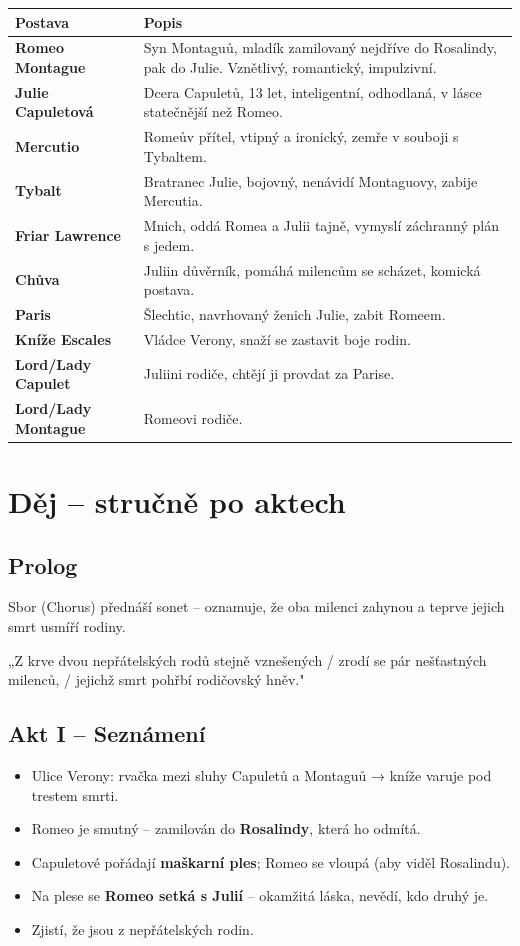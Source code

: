 \documentclass[12pt,a4paper]{article}
\begin{document}
\begin{tabular}{>{\bfseries}p{3.5cm} p{10cm}}
  \toprule
  Postava & Popis \\
  \midrule
  Romeo Montague & Syn Montaguů, mladík zamilovaný nejdříve do Rosalindy, pak do Julie. Vznětlivý, romantický, impulzivní. \\[0.3em]
  Julie Capuletová & Dcera Capuletů, 13 let, inteligentní, odhodlaná, v lásce statečnější než Romeo. \\[0.3em]
  Mercutio & Romeův přítel, vtipný a ironický, zemře v souboji s Tybaltem. \\[0.3em]
  Tybalt & Bratranec Julie, bojovný, nenávidí Montaguovy, zabije Mercutia. \\[0.3em]
  Friar Lawrence & Mnich, oddá Romea a Julii tajně, vymyslí záchranný plán s jedem. \\[0.3em]
  Chůva & Juliin důvěrník, pomáhá milencům se scházet, komická postava. \\[0.3em]
  Paris & Šlechtic, navrhovaný ženich Julie, zabit Romeem. \\[0.3em]
  Kníže Escales & Vládce Verony, snaží se zastavit boje rodin. \\[0.3em]
  Lord/Lady Capulet & Juliini rodiče, chtějí ji provdat za Parise. \\[0.3em]
  Lord/Lady Montague & Romeovi rodiče. \\
  \bottomrule
\end{tabular}

\section{Děj – stručně po aktech}

\subsection{Prolog}
Sbor (Chorus) přednáší sonet – oznamuje, že oba milenci zahynou a teprve jejich smrt usmíří rodiny.

\begin{citace}
„Z krve dvou nepřátelských rodů stejně vznešených / zrodí se pár nešťastných milenců, / jejichž smrt pohřbí rodičovský hněv."
\end{citace}

\subsection{Akt I – Seznámení}
\begin{itemize}[leftmargin=1.5em]
  \item Ulice Verony: rvačka mezi sluhy Capuletů a Montaguů → kníže varuje pod trestem smrti.
  \item Romeo je smutný – zamilován do \textbf{Rosalindy}, která ho odmítá.
  \item Capuletové pořádají \textbf{maškarní ples}; Romeo se vloupá (aby viděl Rosalindu).
  \item Na plese se \textbf{Romeo setká s Julií} – okamžitá láska, nevědí, kdo druhý je.
  \item Zjistí, že jsou z nepřátelských rodin.
\end{itemize}
\end{document}
